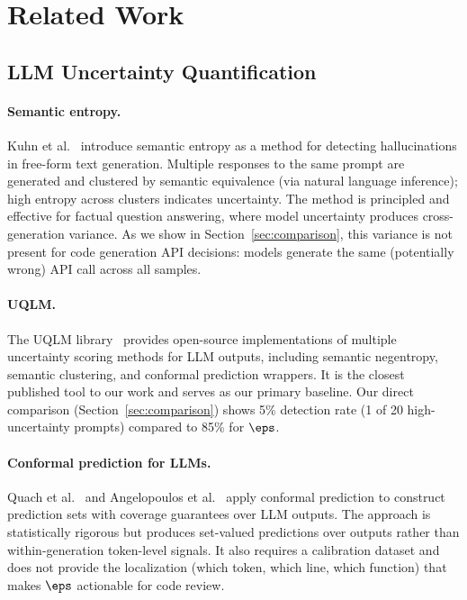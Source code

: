 \section{Related Work}
\label{sec:related}

\subsection{LLM Uncertainty Quantification}

\paragraph{Semantic entropy.}
Kuhn et al.~\cite{kuhn2023semantic} introduce semantic entropy as a method for
detecting hallucinations in free-form text generation. Multiple responses to
the same prompt are generated and clustered by semantic equivalence (via
natural language inference); high entropy across clusters indicates uncertainty.
The method is principled and effective for factual question answering, where
model uncertainty produces cross-generation variance. As we show in
Section~\ref{sec:comparison}, this variance is not present for code generation
API decisions: models generate the same (potentially wrong) API call across
all samples.

\paragraph{UQLM.}
The UQLM library~\cite{uqlm2024} provides open-source implementations of
multiple uncertainty scoring methods for LLM outputs, including semantic
negentropy, semantic clustering, and conformal prediction wrappers. It is the
closest published tool to our work and serves as our primary baseline.
Our direct comparison (Section~\ref{sec:comparison}) shows 5\% detection rate
(1 of 20 high-uncertainty prompts) compared to 85\% for $\eps$.

\paragraph{Conformal prediction for LLMs.}
Quach et al.~\cite{quach2023conformal} and Angelopoulos et al.~\cite{angelopoulos2022conformal}
apply conformal prediction to construct prediction sets with coverage
guarantees over LLM outputs. The approach is statistically rigorous but
produces set-valued predictions over outputs rather than within-generation
token-level signals. It also requires a calibration dataset and does not
provide the localization (which token, which line, which function) that
makes $\eps$ actionable for code review.

